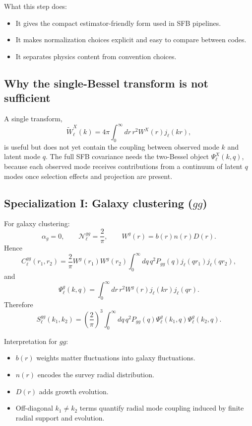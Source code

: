 What this step does:
\begin{itemize}
\item It gives the compact estimator-friendly form used in SFB pipelines.
\item It makes normalization choices explicit and easy to compare between codes.
\item It separates physics content from convention choices.
\end{itemize}

\subsection{Why the single-Bessel transform is not sufficient}

A single transform,
\begin{equation}
\widetilde W_\ell^X(k)=4\pi\int_0^{\infty}dr\,r^2W^X(r)j_\ell(kr),
\end{equation}
is useful but does not yet contain the coupling between observed mode $k$ and
latent mode $q$. The full SFB covariance needs the two-Bessel object
$\Psi_\ell^X(k,q)$, because each observed mode receives contributions from a
continuum of latent $q$ modes once selection effects and projection are present.

\subsection{Specialization I: Galaxy clustering ($gg$)}

For galaxy clustering:
\begin{equation}
\alpha_g=0,
\qquad
\mathcal N_\ell^{gg}=\frac{2}{\pi},
\qquad
W^g(r)=b(r)n(r)D(r).
\end{equation}
Hence
\begin{equation}
C_\ell^{gg}(r_1,r_2)
=\frac{2}{\pi}W^g(r_1)W^g(r_2)
\int_0^{\infty}dq\,q^2P_{gg}(q)j_\ell(qr_1)j_\ell(qr_2),
\end{equation}
and
\begin{equation}
\Psi_\ell^g(k,q)=\int_0^{\infty}dr\,r^2W^g(r)j_\ell(kr)j_\ell(qr).
\end{equation}
Therefore
\begin{equation}
S_\ell^{gg}(k_1,k_2)
=\left(\frac{2}{\pi}\right)^3
\int_0^{\infty}dq\,q^2P_{gg}(q)
\Psi_\ell^g(k_1,q)\Psi_\ell^g(k_2,q).
\label{eq:sfb_gg_final}
\end{equation}

Interpretation for $gg$:
\begin{itemize}
\item $b(r)$ weights matter fluctuations into galaxy fluctuations.
\item $n(r)$ encodes the survey radial distribution.
\item $D(r)$ adds growth evolution.
\item Off-diagonal $k_1\neq k_2$ terms quantify radial mode coupling induced by
finite radial support and evolution.
\end{itemize}

